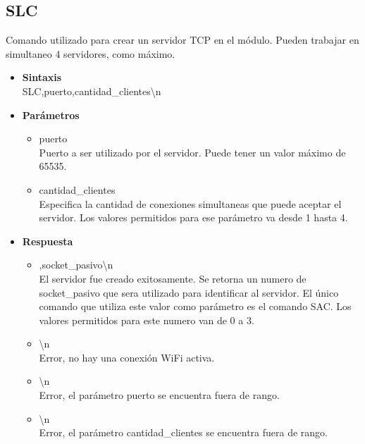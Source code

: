 \documentclass[a4paper,spanish]{article}
\begin{document}
\subsection{SLC}
Comando utilizado para crear un servidor TCP en el módulo. Pueden trabajar en simultaneo 4 servidores, como máximo.  
\begin{itemize}
	\item \textbf{Sintaxis}\\
	{\ttfamily SLC,puerto,cantidad\_clientes\textbackslash n}
	\item \textbf{Parámetros}
	\begin{itemize}
		\item{\ttfamily puerto}\\
		Puerto a ser utilizado por el servidor. Puede tener un valor máximo de 65535.
		\item{\ttfamily cantidad\_clientes}\\
		Especifica la cantidad de conexiones simultaneas que puede aceptar el servidor. Los valores permitidos para ese parámetro va desde 1 hasta 4. 
	\end{itemize}
	\item \textbf{Respuesta}
	\begin{itemize}
		\item{,socket\_pasivo\textbackslash n} \\
		El servidor fue creado exitosamente. Se retorna un numero de {\ttfamily socket\_pasivo} que sera utilizado para identificar al servidor. El único comando que utiliza este valor como parámetro es el comando SAC. Los valores permitidos para este numero van de 0 a 3.
		\item{\textbackslash n} \\
		Error, no hay una conexión WiFi activa.
		\item{\textbackslash n} \\
		Error, el parámetro {\ttfamily puerto} se encuentra fuera de rango.
		\item{\textbackslash n} \\
		Error, el parámetro {\ttfamily cantidad\_clientes} se encuentra fuera de rango.
	\end{itemize}
\end{itemize}
\end{document}
